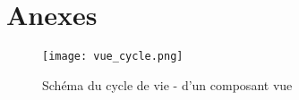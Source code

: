 \section{Anexes}

  
\begin{figure}[htbp]
    \center
    \texttt{[image: vue\_cycle.png]}
    \label{fig:vue_cycle}
    \caption{Schéma du cycle de vie - d'un composant vue\cite{vuelifecycle}}
\end{figure}
    